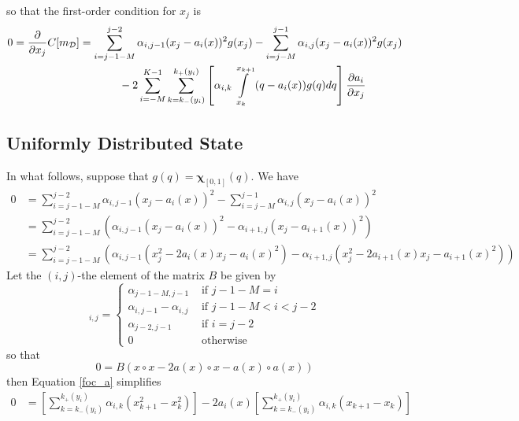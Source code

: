 \documentclass[12pt]{article}
\begin{document}
so that the first-order condition for $x_{j}$ is
\begin{align}
	0=\frac{\partial}{\partial x_{j}}C[m_{\mathcal{D}}]&=\sum_{i=j-1-M}^{j-2}{\alpha_{i,j-1}(x_{j}-a_{i}(x))^{2}g(x_{j})}-\sum_{i=j-M}^{j-1}{\alpha_{i,j}(x_{j}-a_{i}(x))^{2}g(x_{j})}\notag\\
	&\hspace{.5in}-2\sum_{i=-M}^{K-1}{\sum_{k=k_{-}(y_{i})}^{k_{+}(y_{i})}{\left[\alpha_{i,k}\int\displaylimits_{x_{k}}^{x_{k+1}}{(q-a_{i}(x))g(q)dq}\right]\frac{\partial a_{i}}{\partial x_{j}}}}
\end{align}

\subsection{Uniformly Distributed State}
In what follows, suppose that $g(q)=\mathbf{\chi}_{[0,1]}(q)$. We have
\begin{align}
	0&=\sum_{i=j-1-M}^{j-2}{\alpha_{i,j-1}(x_{j}-a_{i}(x))^{2}}-\sum_{i=j-M}^{j-1}{\alpha_{i,j}(x_{j}-a_{i}(x))^{2}}\\
	&=\sum_{i=j-1-M}^{j-2}{\left(\alpha_{i,j-1}(x_{j}-a_{i}(x))^{2}-\alpha_{i+1,j}(x_{j}-a_{i+1}(x))^{2}\right)}\\
	&=\sum_{i=j-1-M}^{j-2}{\left(\alpha_{i,j-1}\left(x_{j}^{2}-2a_{i}(x)x_{j}-a_{i}(x)^{2}\right)-\alpha_{i+1,j}\left(x_{j}^{2}-2a_{i+1}(x)x_{j}-a_{i+1}(x)^{2}\right)\right)}
\end{align}
Let the $(i,j)$-the element of the matrix $B$ be given by
\begin{equation}
	[B]_{i,j}=
	\begin{cases}
		\alpha_{j-1-M,j-1} & \text{ if } j-1-M=i \\
		\alpha_{i,j-1}-\alpha_{i,j} & \text{ if } j-1-M<i<j-2 \\
		\alpha_{j-2,j-1} & \text{ if } i=j-2 \\
		0 & \text{ otherwise }
	\end{cases}
\end{equation}
so that
\begin{equation}
	0=B\left(x\circ x-2a(x)\circ x-a(x)\circ a(x)\right)
\end{equation}
then Equation \ref{foc_a} simplifies
\begin{align}
	0&=\left[\sum_{k=k_{-}(y_{i})}^{k_{+}(y_{i})}{\alpha_{i,k}\left(x_{k+1}^{2}-x_{k}^{2}\right)}\right]-2a_{i}(x)\left[\sum_{k=k_{-}(y_{i})}^{k_{+}(y_{i})}{\alpha_{i,k}(x_{k+1}-x_{k})}\right]
\end{align}
\end{document}

